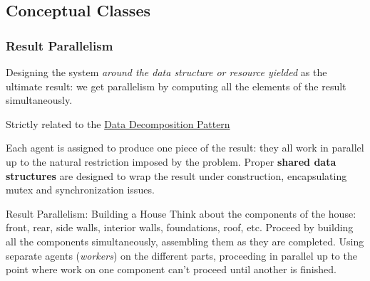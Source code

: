\subsection{Conceptual Classes}\label{sub:ed_conceptual_classes} %
\subsubsection{Result Parallelism}\label{sub:ed_result_parallelism} %
Designing the system \textit{around the data structure or resource yielded} as the ultimate result: we get parallelism by computing all the elements of the result simultaneously.
\begin{note}
    Strictly related to the \hyperref[sub:ed_data_decomposition_pattern]{Data Decomposition Pattern}
\end{note}
Each agent is assigned to produce one piece of the result: they all work in parallel up to the natural restriction imposed by the problem.
Proper \textbf{shared data structures} are designed to wrap the result under construction, encapsulating mutex and synchronization issues.
\begin{example}{Result Parallelism: Building a House}{}
    Think about the components of the house: front, rear, side walls, interior walls, foundations, roof, etc.
    Proceed by building all the components simultaneously, assembling them as they are completed.
    \emptyln{}
    Using separate agents (\textit{workers}) on the different parts, proceeding in parallel up to the point where work on one component can't proceed until another is finished.
\end{example}
%
